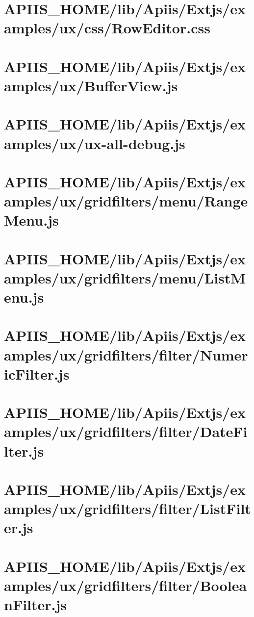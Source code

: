 \section{APIIS\_HOME/lib/Apiis/Extjs/examples/ux/css/RowEditor.css} 
\section{APIIS\_HOME/lib/Apiis/Extjs/examples/ux/BufferView.js} 
\section{APIIS\_HOME/lib/Apiis/Extjs/examples/ux/ux-all-debug.js} 
\section{APIIS\_HOME/lib/Apiis/Extjs/examples/ux/gridfilters/menu/RangeMenu.js} 
\section{APIIS\_HOME/lib/Apiis/Extjs/examples/ux/gridfilters/menu/ListMenu.js} 
\section{APIIS\_HOME/lib/Apiis/Extjs/examples/ux/gridfilters/filter/NumericFilter.js} 
\section{APIIS\_HOME/lib/Apiis/Extjs/examples/ux/gridfilters/filter/DateFilter.js} 
\section{APIIS\_HOME/lib/Apiis/Extjs/examples/ux/gridfilters/filter/ListFilter.js} 
\section{APIIS\_HOME/lib/Apiis/Extjs/examples/ux/gridfilters/filter/BooleanFilter.js} 

